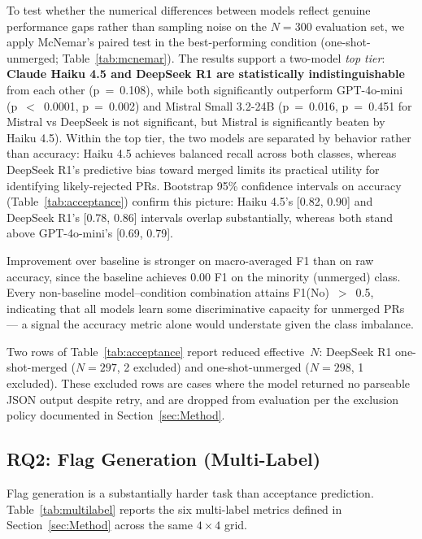 To test whether the numerical differences between models reflect
genuine performance gaps rather than sampling noise on the $N=300$
evaluation set, we apply McNemar's paired test in the best-performing
condition (one-shot-unmerged; Table~\ref{tab:mcnemar}).  The results
support a two-model \emph{top tier}: \textbf{Claude Haiku 4.5 and
DeepSeek R1 are statistically indistinguishable} from each other
(p~=~0.108), while both significantly outperform GPT-4o-mini
(p~$<$~0.0001, p~=~0.002) and Mistral Small 3.2-24B (p~=~0.016,
p~=~0.451 for Mistral vs DeepSeek is not significant, but Mistral is
significantly beaten by Haiku 4.5).  Within the top tier, the two
models are separated by behavior rather than accuracy: Haiku 4.5
achieves balanced recall across both classes, whereas DeepSeek R1's
predictive bias toward merged limits its practical utility for
identifying likely-rejected PRs.  Bootstrap 95\% confidence intervals
on accuracy (Table~\ref{tab:acceptance}) confirm this picture: Haiku
4.5's [0.82, 0.90] and DeepSeek R1's [0.78, 0.86] intervals overlap
substantially, whereas both stand above GPT-4o-mini's [0.69, 0.79].

Improvement over baseline is stronger on macro-averaged F1 than on
raw accuracy, since the baseline achieves 0.00 F1 on the minority
(unmerged) class.  Every non-baseline model--condition combination
attains F1(No)~$>$~0.5, indicating that all models learn some
discriminative capacity for unmerged PRs --- a signal the accuracy
metric alone would understate given the class imbalance.

Two rows of Table~\ref{tab:acceptance} report reduced effective~$N$:
DeepSeek R1 one-shot-merged ($N=297$, 2 excluded) and one-shot-unmerged
($N=298$, 1 excluded).  These excluded rows are cases where the model
returned no parseable JSON output despite retry, and are dropped from
evaluation per the exclusion policy documented in
Section~\ref{sec:Method}.

\subsection{RQ2: Flag Generation (Multi-Label)}\label{sec:results-rq2}

Flag generation is a substantially harder task than acceptance
prediction.  Table~\ref{tab:multilabel} reports the six multi-label
metrics defined in Section~\ref{sec:Method} across the same
$4 \times 4$ grid.


